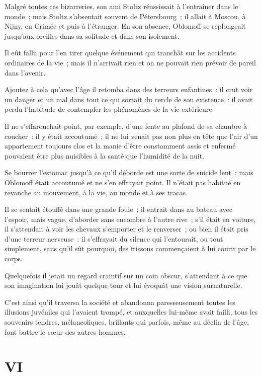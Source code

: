 \documentclass[french,twoside]{book} %
\begin{document}
Malgré toutes ces bizarreries, son ami Stoltz réussissait à l’entraîner dans le monde ; mais Stoltz s’absentait souvent de Pétersbourg ; il allait à Moscou, à Nijny, en Crimée et puis à l’étranger. En son absence, Oblomoff se replongeait jusqu’aux oreilles dans sa solitude et dans son isolement.\par
Il eût fallu pour l’en tirer quelque événement qui tranchât sur les accidents ordinaires de la vie ; mais il n’arrivait rien et on ne pouvait rien prévoir de pareil dans l’avenir.\par
Ajoutez à cela qu’avec l’âge il retomba dans des terreurs enfantines : il crut voir un danger et un mal dans tout ce qui sortait du cercle de son existence : il avait perdu l’habitude de contempler les phénomènes de la vie extérieure.\par
Il ne s’effarouchait point, par exemple, d’une fente au plafond de sa chambre à coucher : il y était accoutumé ; il ne lui venait pas non plus en tête que l’air d’un appartement toujours clos et la manie d’être constamment assis et enfermé pouvaient être plus nuisibles à la santé que l’humidité de la nuit.\par
Se bourrer l’estomac jusqu’à ce qu’il déborde est une sorte de suicide lent ; mais Oblomoff était accoutumé et ne s’en effrayait point. Il n’était pas habitué en revanche au mouvement, à la vie, au monde et à ses tracas.\par
Il se sentait étouffé dans une grande foule ; il entrait dans au bateau avec l’espoir, mais vague, d’aborder sans encombre à l’autre rive ; s’il était en voiture, il s’attendait à voir les chevaux s’emporter et le renverser ; ou bien il était pris d’une terreur nerveuse : il s’effrayait du silence qui l’entourait, ou tout simplement, sans qu’il sût pourquoi, des frissons commençaient à lui courir par le corps.\par
Quelquefois il jetait un regard craintif sur un coin obscur, s’attendant à ce que son imagination lui jouât quelque tour et lui évoquât une vision surnaturelle.\par
C’est ainsi qu’il traversa la société et abandonna paresseusement toutes les illusions juvéniles qui l’avaient trompé, et auxquelles lui-même avait failli, tous les souvenirs tendres, mélancoliques, brillants qui parfois, même au déclin de l’âge, font battre le cœur des autres hommes.
\section[{VI}]{VI}\renewcommand{\leftmark}{VI}
\end{document}

